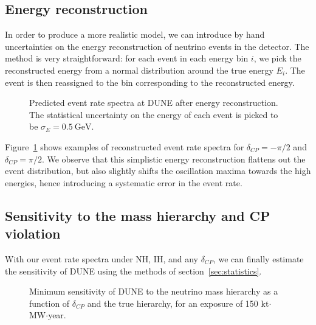 \subsection{Energy reconstruction}
In order to produce a more realistic model, we can introduce by hand
uncertainties on the energy reconstruction of neutrino events in the detector.
The method is very straightforward: for each event in each energy bin $i$, we
pick the reconstructed energy from a normal distribution around the true energy
$E_i$. The event is then reassigned to the bin corresponding to the
reconstructed energy.
\begin{figure}
	\centering
	\caption{Predicted event rate spectra at DUNE after energy reconstruction.
	The statistical uncertainty on the energy of each event is picked to be
	$\sigma_E = \SI{0.5}{\GeV}$.}
\label{fig:event_rate_reconstructed}
\end{figure}

Figure~\ref{fig:event_rate_reconstructed} shows examples of reconstructed event
rate spectra for $\delta_{CP}=-\pi/2$ and $\delta_{CP}=\pi/2$. We observe that
this simplistic energy reconstruction flattens out the event distribution, but
also slightly shifts the oscillation maxima towards the high energies, hence
introducing a systematic error in the event rate.

\subsection{Sensitivity to the mass hierarchy and CP violation}
With our event rate spectra under NH, IH, and any $\delta_{CP}$, we can finally
estimate the sensitivity of DUNE using the methods of
section~\ref{sec:statistics}. 
\begin{figure}
	\centering
\caption{Minimum sensitivity of DUNE to the neutrino mass hierarchy as a
	function of $\delta_{CP}$ and the true hierarchy, for an exposure of
	150 kt$\cdot$MW$\cdot$year.}
	\label{fig:sens_mh}
\end{figure}

